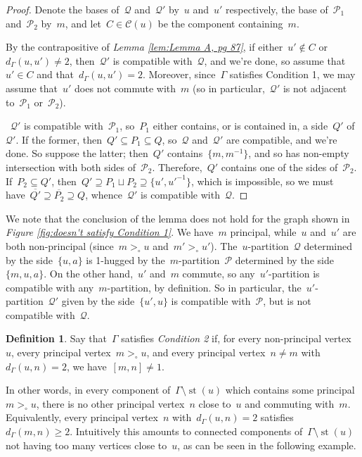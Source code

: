 \documentclass[11pt]{amsart}
\theoremstyle{definition}
\theoremstyle{definition}
\theoremstyle{definition}
\theoremstyle{definition}
\newtheorem{definition}[theorem]{Definition}
\newcommand{\calC}{\mathcal{C}}
\newcommand{\calQ}{\mathcal{Q}}
\newcommand{\calP}{\mathcal{P}} %
\newcommand{\str}[1]{\operatorname{st}({#1})} %
\begin{document}
\begin{proof}
    Denote the bases of~$\calQ$ and~$\calQ'$ by~$u$ and~$u'$ respectively, the base of~$\calP_1$ and~$\calP_2$ by~$m$, and let~$C \in \calC(u)$ be the component containing~$m$.

    By the contrapositive of \emph{Lemma \ref{lem:Lemma A, pg 87}}, if either~$u' \notin C$ or~$d_\Gamma(u, u') \neq 2$, then~$\calQ'$ is compatible with~$\calQ$, and we're done, so assume that~$u' \in C$ and that~$d_\Gamma(u, u') = 2$. Moreover, since~$\Gamma$ satisfies Condition 1, we may assume that~$u'$ does not commute with~$m$ (so in particular,~$\calQ'$ is not adjacent to~$\calP_1$ or~$\calP_2$).

   ~$\calQ'$ is compatible with~$\calP_1$, so~$P_1$ either contains, or is contained in, a side~$Q'$ of~$\calQ'$. If the former, then~$Q' \subseteq P_1 \subseteq Q$, so~$\calQ$ and~$\calQ'$ are compatible, and we're done. So suppose the latter; then~$Q'$ contains~$\{m, m^{-1}\}$, and so has non-empty intersection with both sides of~$\calP_2$. Therefore,~$Q'$ contains one of the sides of~$\calP_2$. If~$P_2 \subseteq Q'$, then~$Q' \supseteq P_1 \sqcup P_2 \supseteq \{u', u'^{-1}\}$, which is impossible, so we must have~$\overline{Q'} \supseteq \overline{P_2} \supseteq Q$, whence~$\calQ'$ is compatible with~$\calQ$.
\end{proof}

We note that the conclusion of the lemma does not hold for the graph shown in \emph{Figure \ref{fig:doesn't satisfy Condition 1}}. We have~$m$ principal, while~$u$ and~$u'$ are both non-principal (since~$m >_\circ u$ and~$m' >_\circ u'$). The~$u$-partition~$\calQ$ determined by the side~$\{u, a\}$ is 1-hugged by the~$m$-partition~$\calP$ determined by the side~$\{m, u, a\}$. On the other hand,~$u'$ and~$m$ commute, so any~$u'$-partition is compatible with any~$m$-partition, by definition. So in particular, the~$u'$-partition~$\calQ'$ given by the side~$\{u', u\}$ is compatible with~$\calP$, but is not compatible with~$\calQ$.

\begin{definition}\label{def:condition 2 (NEW)}
    Say that~$\Gamma$ satisfies \emph{Condition 2} if, for every non-principal vertex~$u$, every principal vertex~$m >_\circ u$, and every principal vertex~$n \neq m$ with~$d_\Gamma(u, n) = 2$, we have~$[m, n] \neq 1$.
\end{definition}

In other words, in every component of~$\Gamma \setminus \str{u}$ which contains some principal~$m >_\circ u$, there is no other principal vertex~$n$ close to~$u$ and commuting with~$m$. Equivalently, every principal vertex~$n$ with~$d_\Gamma(u, n) = 2$ satisfies~$d_\Gamma(m, n) \geq 2$. Intuitively this amounts to connected components of~$\Gamma \setminus \str{u}$ not having too many vertices close to~$u$, as can be seen in the following example.
\end{document}
